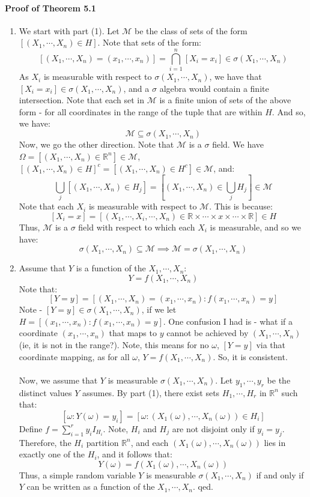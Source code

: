 \documentclass[12pt,a4paper]{article}
\newcommand{\1}[1]{\mathbbm{1}\left\{ #1 \right\}}
\newcommand{\R}{\mathbb{R}}
\newcommand{\mcal}{\mathcal{M}}
\begin{document}
\paragraph{Proof of Theorem 5.1}
\begin{enumerate}
	\item We start with part (1). Let $\mcal$ be the class of sets of the form $\left[(X_1, \cdots, X_n) \in H\right]$. Note that sets of the form:
	$$
		\left[(X_1, \cdots, X_n) = (x_1, \cdots, x_n)\right] =
		\bigcap_{i=1}^n [X_i = x_i] \in \sigma(X_1, \cdots, X_n)
	$$
	As $X_i$ is measurable with respect to $\sigma(X_1, \cdots, X_n)$, we have that $[X_i = x_i] \in \sigma(X_1, \cdots, X_n)$, and a $\sigma$ algebra would contain a finite intersection. Note that each set in $\mcal$ is a finite union of sets of the above form - for all coordinates in the range of the tuple that are within $H$. And so, we have:
	$$
		\mcal \subseteq \sigma(X_1, \cdots, X_n)
	$$
	Now, we go the other direction. Note that $\mcal$ is a $\sigma$ field. We have $\Omega = [(X_1, \cdots, X_n) \in \R^n] \in \mcal$, $[(X_1, \cdots, X_n) \in H]^c = [(X_1, \cdots, X_n) \in H^c] \in \mcal$, and:
	$$
		\bigcup_j [(X_1, \cdots, X_n) \in H_j] = [(X_1, \cdots, X_n) \in \bigcup_j H_j] \in \mcal
	$$
	Note that each $X_i$ is measurable with respect to $\mcal$. This is because:
	$$
		[X_i = x] = [(X_1, \cdots, X_i, \cdots, X_n) \in \R \times \cdots \times x \times \cdots \times \R] \in H
	$$
	Thus, $\mcal$ is a $\sigma$ field with respect to which each $X_i$ is measurable, and so we have:
	$$
		\sigma(X_1, \cdots, X_n) \subseteq \mcal \implies
		\mcal = \sigma(X_1, \cdots, X_n)
	$$
	
	\item Assume that $Y$ is a function of the $X_1, \cdots, X_n$:
	$$
		Y = f(X_1, \cdots, X_n)
	$$
	Note that:
	$$
		[Y = y] = [(X_1, \cdots, X_n) = (x_1, \cdots, x_n) : f(x_1, \cdots, x_n) = y]
	$$
	Note - $[Y = y] \in \sigma(X_1, \cdots, X_n)$, if we let $H = [(x_1, \cdots, x_n) : f(x_1, \cdots, x_n) = y]$. One confusion I had is - what if a coordinate $(x_1, \cdots, x_n)$ that maps to $y$ cannot be achieved by $(X_1, \cdots, X_n)$ (ie, it is not in the range?). Note, this means for no $\omega$, $[Y = y]$ via that coordinate mapping, as for all $\omega$, $Y = f(X_1, \cdots, X_n)$. So, it is consistent.
	\\\\
	Now, we assume that $Y$ is measurable $\sigma(X_1, \cdots, X_n)$. Let $y_1, \cdots, y_r$ be the distinct values $Y$ assumes. By part (1), there exist sets $H_1, \cdots, H_r$ in $\R^n$ such that:
	$$
		[\omega: Y(\omega) = y_i] = [\omega: (X_1(\omega), \cdots, X_n(\omega)) \in H_i]
	$$
	Define $f = \sum_{i=1}^r y_i I_{H_i}$. Note, $H_i$ and $H_j$ are not disjoint only if $y_i = y_j$. Therefore, the $H_i$ partition $\R^n$, and each $(X_1(\omega), \cdots, X_n(\omega))$ lies in exactly one of the $H_i$, and it follows that:
	$$
		Y(\omega) = f(X_1(\omega), \cdots, X_n(\omega))
	$$
	Thus, a simple random variable $Y$ is measurable $\sigma(X_1, \cdots, X_n)$ if and only if $Y$ can be written as a function of the $X_1, \cdots, X_n$. qed.
\end{enumerate}
\end{document}
